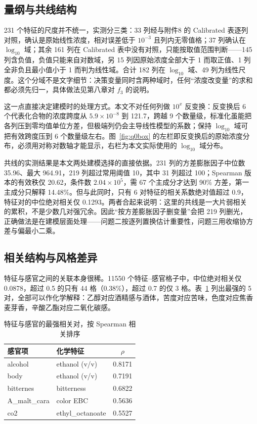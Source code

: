 \subsection{量纲与共线结构}

231 个特征的尺度并不统一，实测分三类：33 列经与附件8 的 Calibrated 表逐列对照，确认是原始线性浓度，相对误差低于 $10^{-3}$ 且列内无零值格；37 列确认在 $\log_{10}$ 域；其余 161 列在 Calibrated 表中没有对照，只能按取值范围判断——145 列含负值，负值只能来自对数域，另 15 列因原始浓度全部大于 1 而取正值、1 列全非负且最小值小于 1 而判为线性域。合计 182 列在 $\log_{10}$ 域、49 列为线性尺度。这个分域不是文字细节：决策变量同时含两种域时，任何“浓度改变量”的求和都必须先归一，具体做法见第八章对 $f_3$ 的说明。

这一点直接决定建模时的处理方式。本文不对任何列做 $10^{x}$ 反变换：反变换后 6 个代表化合物的浓度跨度从 $5.9\times10^{-8}$ 到 121.7，跨越 9 个数量级，标准化虽能把各列压到零均值单位方差，但极端列仍会主导线性模型的系数；保持 $\log_{10}$ 域可把有效跨度压到 6 个数量级左右。图~\ref{fig:q0box} 的左栏即反变换后的原始浓度分布，必须用对称对数轴才能显示，右栏为本文实际使用的 $\log_{10}$ 域分布。



共线的实测结果是本文两处建模选择的直接依据。231 列的方差膨胀因子中位数 35.96、最大 964.91，219 列超过常用阈值 10，其中 31 列超过 100；Spearman 版本的有效秩仅 20.62，条件数 $2.04\times10^5$，需 67 个主成分才达到 90\% 方差，第一主成分只解释 14.48\%。但与此同时，只有 6 对特征的相关系数绝对值超过 0.9，特征对的中位绝对相关仅 0.1293。两者合起来说明：这里的共线是一大片弱相关的累积，不是少数几对强冗余。因此“按方差膨胀因子删变量”会把 219 列删光，正确做法是在建模层面处理——问题二按逐列置换估计重要性，问题三用收缩协方差与偏最小二乘。

\subsection{相关结构与风格差异}

特征与感官之间的关联本身很稀。11550 个特征--感官格子中，中位绝对相关仅 0.0878，超过 0.5 的只有 44 格（0.38\%），超过 0.7 的仅 3 格。表~\ref{tab:senscorr} 列出最强的 5 对，全部可以作化学解释：乙醇对应酒精感与酒体，苦度对应苦味，色度对应焦香麦芽香，辛酸乙酯对应二氧化碳感。

\begin{table}[htbp]
\centering
\footnotesize
\caption{特征与感官的最强相关对，按 Spearman 相关排序}
\label{tab:senscorr}
\begin{tabular*}{\textwidth}{@{\extracolsep{\fill}}llc}
\toprule
\textbf{感官项} & \textbf{化学特征} & $\rho$ \\
\midrule
alcohol & ethanol (v/v) & 0.8171 \\
body & ethanol (v/v) & 0.7191 \\
bitternes & bitterness & 0.6822 \\
A\_malt\_cara & color EBC & 0.5636 \\
co2 & ethyl\_octanoate & 0.5527 \\
\bottomrule
\end{tabular*}
\end{table}

